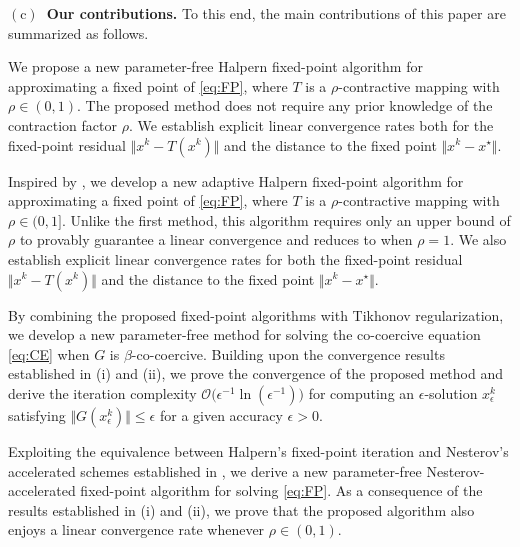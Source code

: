 \documentclass{article}
\theoremstyle{plain}
\theoremstyle{definition}
\newcommand{\norms}[1]{\Vert#1\Vert}
\newcommand{\0}{\boldsymbol{0}}
\newcommand{\BigOs}[1]{\mathcal{O}\big(#1\big)}
\begin{document}
\vspace{0.75ex}
\noindent\textbf{$\mathrm{(c)}$~Our contributions.}
To this end, the main contributions of this paper are summarized as follows.

\begin{compactitem}
\item[$\mathrm{(i)}$]
We propose a new parameter-free Halpern fixed-point algorithm for approximating a fixed point of \eqref{eq:FP}, where $T$ is a $\rho$-contractive mapping with $\rho \in (0,1)$. 
The proposed method does not require any prior knowledge of the contraction factor $\rho$. 
We establish explicit linear convergence rates both for the fixed-point residual $\norms{x^k - T(x^k)}$ and the distance to the fixed point $\norms{x^k - x^{\star}}$.

\item[$\mathrm{(ii)}$]
Inspired by \cite{he2024convergence}, we develop a new adaptive Halpern fixed-point algorithm for approximating a fixed point of \eqref{eq:FP}, where $T$ is a $\rho$-contractive mapping with $\rho \in (0,1]$. 
Unlike the first method, this algorithm requires only an upper bound of $\rho$ to provably guarantee a linear convergence and reduces to \cite[Algorithm~3.1]{he2024convergence} when $\rho=1$. 
We also establish explicit linear convergence rates for both the fixed-point residual $\norms{x^k - T(x^k)}$ and the distance to the fixed point $\norms{x^k - x^{\star}}$.

\item[$\mathrm{(iii)}$]
By combining the proposed fixed-point algorithms with Tikhonov regularization, we develop a new parameter-free method for solving the co-coercive equation \eqref{eq:CE} when $G$ is $\beta$-co-coercive. 
Building upon the convergence results established in (i) and (ii), we prove the convergence of the proposed method and derive the iteration complexity $\BigOs{\epsilon^{-1}\ln(\epsilon^{-1})}$ for computing an $\epsilon$-solution $x^k_{\epsilon}$ satisfying $\norms{G(x^k_{\epsilon})}\leq\epsilon$ for a given accuracy $\epsilon > 0$.

\item[$\mathrm{(iv)}$]
Exploiting the equivalence between Halpern's fixed-point iteration and Nesterov's accelerated schemes established in \cite{tran2022connection}, we derive a new parameter-free Nesterov-accelerated fixed-point algorithm for solving \eqref{eq:FP}. 
As a consequence of the results established in (i) and (ii), we prove that the proposed algorithm also enjoys a linear convergence rate whenever $\rho\in(0,1)$.
\end{compactitem}
\end{document}
